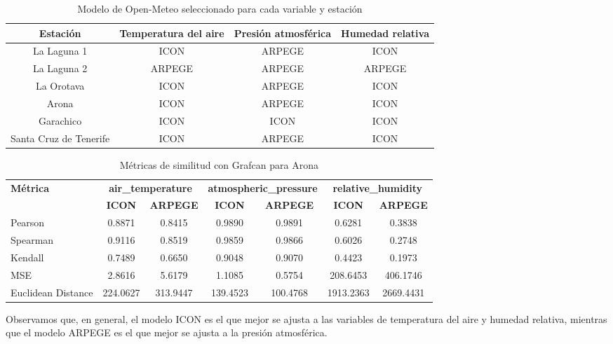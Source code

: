 \begin{table}[htb]
    \small
    \centering
    \begin{tabular}{|c|c|c|c|}
        \hline
        Estación & Temperatura del aire & Presión atmosférica & Humedad relativa \\
        \hline
        La Laguna 1 & ICON & ARPEGE & ICON \\
        La Laguna 2 & ARPEGE & ARPEGE & ARPEGE \\
        La Orotava & ICON & ARPEGE & ICON \\
        Arona & ICON & ARPEGE & ICON \\
        Garachico & ICON & ICON & ICON \\
        Santa Cruz de Tenerife & ICON & ARPEGE & ICON \\
        \hline
    \end{tabular}
    \caption{Modelo de Open-Meteo seleccionado para cada variable y estación}
    \label{tabla_modelos_seleccionados}
\end{table}

\begin{table}[h!]
\centering
\caption{Métricas de similitud con Grafcan para Arona}
\label{tab:sim_metrics}
\footnotesize {
\begin{tabular}{l  cc  cc  cc}
\toprule
\textbf{Métrica} &
\multicolumn{2}{c}{\textbf{air\_temperature}} &
\multicolumn{2}{c}{\textbf{atmospheric\_pressure}} &
\multicolumn{2}{c}{\textbf{relative\_humidity}} \\
\cmidrule(lr){2-3} \cmidrule(lr){4-5} \cmidrule(lr){6-7}
 & \textbf{ICON} & \textbf{ARPEGE} & \textbf{ICON} & \textbf{ARPEGE} & \textbf{ICON} & \textbf{ARPEGE} \\
\midrule
Pearson               & 0.8871 & 0.8415 & 0.9890 & 0.9891 & 0.6281 & 0.3838 \\
Spearman              & 0.9116 & 0.8519 & 0.9859 & 0.9866 & 0.6026 & 0.2748 \\
Kendall               & 0.7489 & 0.6650 & 0.9048 & 0.9070 & 0.4423 & 0.1973 \\
MSE                   & 2.8616 & 5.6179 & 1.1085 & 0.5754 & 208.6453 & 406.1746 \\
Euclidean Distance    & 224.0627 & 313.9447 & 139.4523 & 100.4768 & 1913.2363 & 2669.4431 \\
\bottomrule
\end{tabular}
}
\end{table}


Observamos que, en general, el modelo ICON es el que mejor se ajusta a las variables de temperatura del aire y humedad relativa,
 mientras que el modelo ARPEGE es el que mejor se ajusta a la presión atmosférica.

